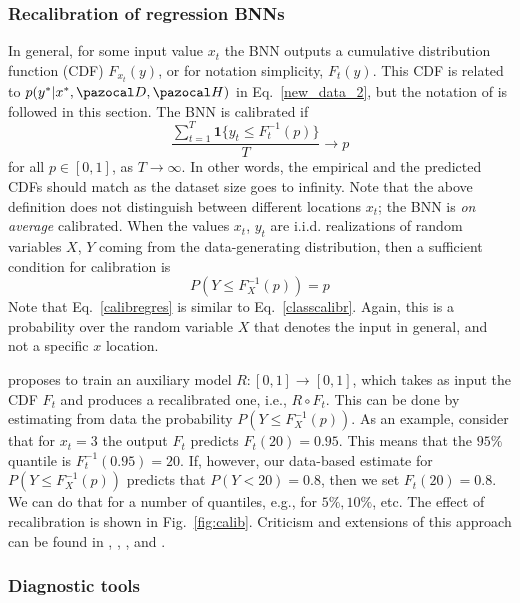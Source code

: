 \subsubsection{Recalibration of regression BNNs}\label{sec:recalib}
In general, for some input value $x_t$ the BNN outputs a cumulative distribution function (CDF) $F_{x_{t}}(y)$, or for notation simplicity, $F_{t}(y)$.
This CDF is related to $p(y^*|x^*, \cD, \cH)$ in Eq.~\eqref{new_data_2}, but the notation of \textcite{kuleshov2018accurate} is followed in this section. 
The BNN is calibrated if 
\begin{equation}
	\frac{\sum_{t=1}^{T} \textbf{1}\{y_t\leq F_t^{-1}(p)\}}{T} \to p
\end{equation}
for all $p \in [0,1]$, as $T \to \infty$. 
In other words, the empirical and the predicted CDFs should match as the dataset size goes to infinity. 
Note that the above definition does not distinguish between different locations $x_t$; the BNN is \textit{on average} calibrated. 
When the values $x_t$, $y_t$ are i.i.d. realizations of random variables $X$, $Y$ coming from the data-generating distribution, then a sufficient condition for calibration is
\begin{equation}\label{calibregres}
P(Y\leq F_X^{-1}(p)) = p
\end{equation}
Note that Eq.~\eqref{calibregres} is similar to Eq.~\eqref{classcalibr}.
Again, this is a probability over the random variable $X$ that denotes the input in general, and not a specific $x$ location.

\textcite{kuleshov2018accurate} proposes to train an auxiliary model $R:[0,1] \to [0,1]$, which takes as input the CDF $F_t$ and produces a recalibrated one, i.e., $R \circ F_t$. 
This can be done by estimating from data the probability $P(Y\leq F_X^{-1}(p))$. 
As an example, consider that for $x_t=3$ the output $F_t$ predicts $F_t(20) = 0.95$. 
This means that the $95 \%$ quantile is $F_t^{-1}(0.95) = 20$. 
If, however, our data-based estimate for $P(Y\leq F_X^{-1}(p))$ predicts that $P(Y < 20) = 0.8$, then we set $F_t(20) = 0.8$. 
We can do that for a number of quantiles, e.g., for $5 \%, 10 \%$, etc. 
The effect of recalibration is shown in Fig.~\ref{fig:calib}.
Criticism and extensions of this approach can be found in \textcite{levi2019evaluating}, \textcite{song2019distribution}, \textcite{cui2020calibrated}, and \textcite{zelikman2020crude}.

\subsubsection{Diagnostic tools}
